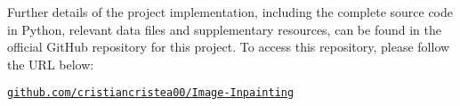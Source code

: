 \label{chaper:code}

Further details of the project implementation, including the complete source code in Python, relevant data files and supplementary resources, can be found in the official GitHub repository for this project. To access this repository, please follow the URL below:

\vspace{1cm}
\begin{center}
    \large\href{https://github.com/cristiancristea00/Image-Inpainting}{\texttt{github.com/cristiancristea00/Image-Inpainting}}
\end{center}
